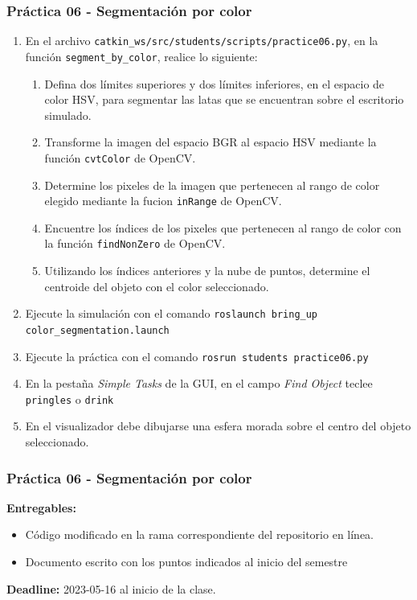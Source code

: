 \begin{frame}\frametitle{Práctica 06 - Segmentación por color}
  \begin{enumerate}
  \item En el archivo \texttt{catkin\_ws/src/students/scripts/practice06.py}, en la función \texttt{segment\_by\_color}, realice lo siguiente:
    \begin{enumerate}
    \item Defina dos límites superiores y dos límites inferiores, en el espacio de color HSV, para segmentar las latas que se encuentran sobre el escritorio simulado.
    \item Transforme la imagen del espacio BGR al espacio HSV mediante la función \texttt{cvtColor} de OpenCV.
    \item Determine los pixeles de la imagen que pertenecen al rango de color elegido mediante la fucion \texttt{inRange} de OpenCV.
    \item Encuentre los índices de los pixeles que pertenecen al rango de color con la función \texttt{findNonZero} de OpenCV.
    \item Utilizando los índices anteriores y la nube de puntos, determine el centroide del objeto con el color seleccionado. 
    \end{enumerate}
  \item Ejecute la simulación con el comando \texttt{roslaunch bring\_up color\_segmentation.launch }
  \item Ejecute la práctica con el comando \texttt{rosrun students practice06.py}
  \item En la pestaña \textit{Simple Tasks} de la GUI, en el campo \textit{Find Object} teclee \texttt{pringles} o \texttt{drink}
  \item En el visualizador debe dibujarse una esfera morada sobre el centro del objeto seleccionado. 
  \end{enumerate}
\end{frame}

\begin{frame}\frametitle{Práctica 06 - Segmentación por color}
 \textbf{Entregables:}
  \begin{itemize}
  \item Código modificado en la rama correspondiente del repositorio en línea.
  \item Documento escrito con los puntos indicados al inicio del semestre
  \end{itemize}
  \textbf{Deadline: } 2023-05-16 al inicio de la clase. 
\end{frame}

